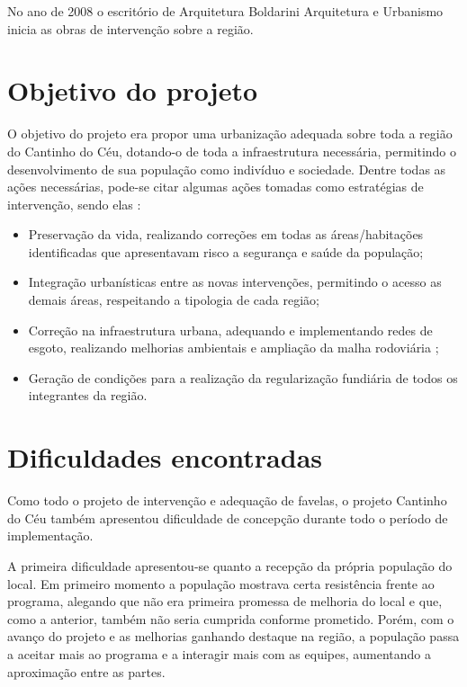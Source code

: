 	No ano de 2008 o escritório de Arquitetura  Boldarini Arquitetura e Urbanismo inicia as obras de intervenção sobre a região.
	
	\section{Objetivo do projeto}
	
	O objetivo do projeto era propor uma urbanização adequada sobre toda a região do Cantinho do Céu, dotando-o de toda a infraestrutura necessária, permitindo o desenvolvimento de sua população como indivíduo e sociedade. Dentre todas as ações necessárias, pode-se citar algumas ações tomadas como estratégias de intervenção, sendo elas \cite{Barda2012}:
	
	\begin{itemize}
	    \item Preservação da vida, realizando correções em todas as áreas/habitações identificadas que apresentavam risco a segurança e saúde da população;
	    \item Integração urbanísticas entre as novas intervenções, permitindo o acesso as demais áreas, respeitando a tipologia de cada região;
	    \item Correção na infraestrutura urbana, adequando e implementando redes de esgoto, realizando melhorias ambientais e ampliação da malha rodoviária ;
	    \item Geração de condições para a realização da regularização fundiária de todos os integrantes da região.
	\end{itemize}
	
	
	\section{Dificuldades encontradas}
	
	Como todo o projeto de intervenção e adequação de favelas, o projeto Cantinho do Céu também apresentou dificuldade de concepção durante todo o período de implementação. 
	
	A primeira dificuldade apresentou-se quanto a recepção da própria população do local. Em primeiro momento a população mostrava certa resistência frente ao programa, alegando que não era primeira promessa de melhoria do local e que, como a anterior, também não seria cumprida conforme prometido. Porém, com o avanço do projeto e as melhorias ganhando destaque na região, a população passa a aceitar mais ao programa e a interagir mais com as equipes, aumentando a aproximação entre as partes.
	
